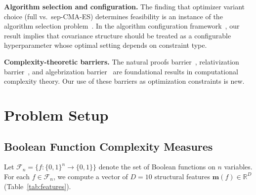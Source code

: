 \documentclass[twoside]{article}
\newcommand{\R}{\mathbb{R}}
\newcommand{\calF}{\mathcal{F}}
\begin{document}
\textbf{Algorithm selection and configuration.}
The finding that optimizer variant choice (full vs.\ sep-CMA-ES) determines
feasibility is an instance of the algorithm selection
problem~\citep{rice1976algorithm,xu2008satzilla}. In the algorithm
configuration framework~\citep{hutter2011smac,lindauer2022smac3}, our result
implies that covariance structure should be treated as a configurable
hyperparameter whose optimal setting depends on constraint type.

\textbf{Complexity-theoretic barriers.}
The natural proofs barrier~\citep{razborov1997natural}, relativization
barrier~\citep{baker1975relativizations}, and algebrization
barrier~\citep{aaronson2008algebrization} are foundational results in
computational complexity theory. Our use of these barriers as optimization
constraints is new.

\section{Problem Setup}
\label{sec:setup}

\subsection{Boolean Function Complexity Measures}

Let $\calF_n = \{f : \{0,1\}^n \to \{0,1\}\}$ denote the set of Boolean functions
on $n$ variables. For each $f \in \calF_n$, we compute a vector of $D=10$
structural features $\mathbf{m}(f) \in \R^D$ (Table~\ref{tab:features}).
\end{document}
